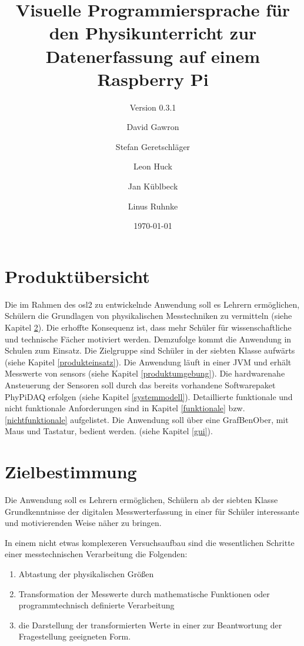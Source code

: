 \documentclass[parskip=full]{scrartcl}
\title{Visuelle Programmiersprache für den Physikunterricht zur Datenerfassung auf einem Raspberry Pi}
\subtitle{Version 0.3.1}
\author{David Gawron \and Stefan Geretschläger \and Leon Huck \and Jan Küblbeck \and Linus Ruhnke}
\date{\today}
\begin{document}
\maketitle

\newpage
\tableofcontents 					%
\newpage

\section{Produktübersicht} %

Die im Rahmen des \gls{osl2} zu entwickelnde Anwendung soll es Lehrern ermöglichen, Schülern die Grundlagen von physikalischen Messtechniken zu vermitteln (siehe Kapitel \ref{zielbestimmung}). Die erhoffte Konsequenz ist, dass mehr Schüler für wissenschaftliche und technische Fächer motiviert werden.
Demzufolge kommt die Anwendung in Schulen zum Einsatz. 
Die Zielgruppe sind Schüler in der siebten Klasse aufwärts (siehe Kapitel \ref{produkteinsatz}).
Die Anwendung läuft in einer \gls{JVM} und erhält Messwerte von \glspl{sensor} (siehe Kapitel \ref{produktumgebung}). 
Die hardwarenahe Ansteuerung der Sensoren soll durch das bereits vorhandene Softwarepaket \gls{PhyPiDAQ} erfolgen (siehe Kapitel \ref{systemmodell}).
Detaillierte funktionale und nicht funktionale Anforderungen sind in Kapitel \ref{funktionale} bzw. \ref{nichtfunktionale} aufgelistet.
Die Anwendung soll über eine \gls{GrafBenOber}, mit Maus und Tastatur, bedient werden. (siehe Kapitel \ref{gui}).

\clearpage
\section{Zielbestimmung}\label{zielbestimmung}

Die Anwendung soll es Lehrern ermöglichen, Schülern ab der siebten Klasse Grundkenntnisse der digitalen Messwerterfassung in einer für Schüler interessante und motivierenden Weise näher zu bringen. 

In einem nicht etwas komplexeren Versuchsaufbau sind die wesentlichen Schritte einer messtechnischen Verarbeitung die Folgenden: 

\begin{enumerate}
	\item Abtastung der physikalischen Größen
	
	\item Transformation der Messwerte durch mathematische Funktionen oder programmtechnisch definierte Verarbeitung
	
	\item die Darstellung der transformierten Werte in einer zur Beantwortung der Fragestellung geeigneten Form.
	
\end{enumerate}
\end{document}
